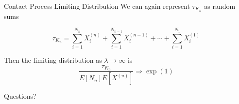 \documentclass{beamer}
\theoremstyle{definition}
\begin{document}
\begin{frame}{Contact Process Limiting Distribution}
We can again represent $\tau_{K_n}$ as random sums

\begin{equation*}\label{eq:wait_contact_sum}
    \tau_{K_n} = \sum_{i = 1}^{N_n} X_i^{(n)} + \sum_{i = 1}^{N_{n - 1}} X_i^{(n - 1)} + \cdots + \sum_{i = 1}^{N_1} X_i^{(1)}
\end{equation*}

Then the limiting distribution as $\lambda \to \infty$ is
$$
\frac{\tau_{K_n}}{E[N_{n}]E[X^{(n)}]} \Rightarrow \exp(1)
$$
\end{frame}

\begin{frame}[standout]
  Questions?
\end{frame}

%
%
%
%
\end{document}
